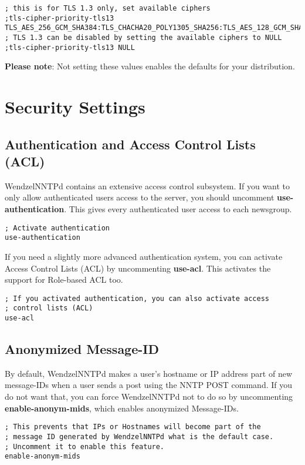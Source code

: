 \begin{verbatim}
; this is for TLS 1.3 only, set available ciphers
;tls-cipher-priority-tls13 TLS_AES_256_GCM_SHA384:TLS_CHACHA20_POLY1305_SHA256:TLS_AES_128_GCM_SHA256:TLS_AES_128_CCM_8_SHA256:TLS_AES_128_CCM_SHA256
; TLS 1.3 can be disabled by setting the available ciphers to NULL
;tls-cipher-priority-tls13 NULL
\end{verbatim}

\textbf{Please note}: Not setting these values enables the defaults for your distribution.

\section{Security Settings}

\subsection{Authentication and Access Control Lists (ACL)}

WendzelNNTPd contains an extensive access control subsystem. If you want to only allow authenticated users access to the server, you should uncomment \textbf{use-authentication}. This gives every authenticated user access to each newsgroup.

\begin{verbatim}
; Activate authentication
use-authentication
\end{verbatim}

If you need a slightly more advanced authentication system, you can activate Access Control Lists (ACL) by uncommenting \textbf{use-acl}. This activates the support for Role-based ACL too.

\begin{verbatim}
; If you activated authentication, you can also activate access
; control lists (ACL)
use-acl
\end{verbatim}

\subsection{Anonymized Message-ID}

By default, WendzelNNTPd makes a user's hostname or IP address part of new message-IDs when a user sends a post using the NNTP POST command. If you do not want that, you can force WendzelNNTPd not to do so by uncommenting \textbf{enable-anonym-mids}, which enables anonymized Message-IDs.

\begin{verbatim}
; This prevents that IPs or Hostnames will become part of the
; message ID generated by WendzelNNTPd what is the default case.
; Uncomment it to enable this feature.
enable-anonym-mids
\end{verbatim}

